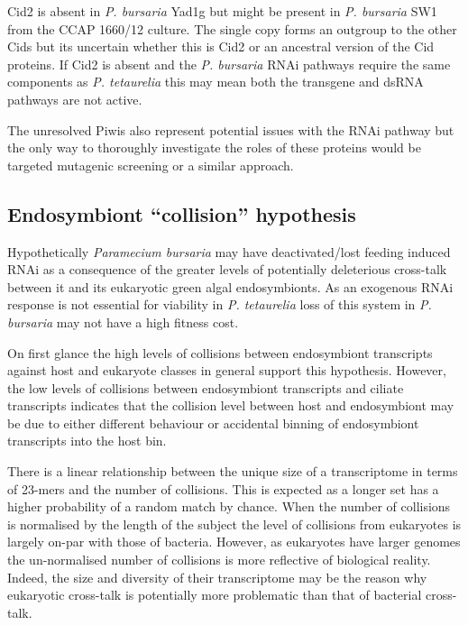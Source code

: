 Cid2 is absent in \textit{P. bursaria} Yad1g but might be present in \textit{P. bursaria}
SW1 from the CCAP 1660/12 culture. The single copy forms an outgroup to the other
Cids but its uncertain whether this is Cid2 or an ancestral version of the 
Cid proteins.  
If Cid2 is absent and the \textit{P. bursaria} RNAi
pathways require the same components as \textit{P. tetaurelia} this may
mean both the transgene and dsRNA pathways are not active. 

The unresolved Piwis also represent potential issues with the RNAi pathway
but the only way to thoroughly investigate the roles of these proteins would
be targeted mutagenic screening or a similar approach.

\subsection{Endosymbiont ``collision'' hypothesis}

Hypothetically \textit{Paramecium bursaria}
may have deactivated/lost feeding induced RNAi as a consequence
of the greater levels of potentially deleterious cross-talk between
it and its eukaryotic green algal endosymbionts.  
As an exogenous RNAi response is not essential 
for viability in \textit{P. tetaurelia} \citep{Marker2014} loss
of this system in \textit{P. bursaria} may not have a high fitness cost.


On first glance the high levels of collisions between endosymbiont
transcripts against host and eukaryote classes in general support this
hypothesis.
However, the low levels of collisions between endosymbiont transcripts
and ciliate transcripts indicates that the collision level
between host and endosymbiont may be due to either
different behaviour or accidental binning of endosymbiont
transcripts into the host bin.


There is a linear relationship between the unique size of a transcriptome
in terms of 23-mers and the number of collisions.  This is expected
as a longer set has a higher probability of a random match by chance.
When the number of collisions is normalised by the length of the subject
the level of collisions from eukaryotes is largely on-par with
those of bacteria.  However, as eukaryotes have larger genomes
the un-normalised number of collisions is more reflective of biological
reality.  Indeed, the size and diversity of their transcriptome
may be the reason why eukaryotic cross-talk is potentially
more problematic than that of bacterial cross-talk.


